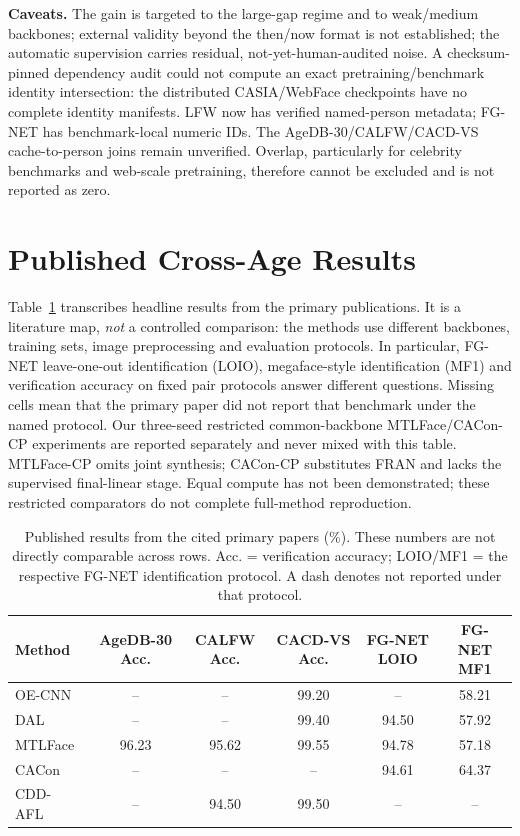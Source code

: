 \documentclass[journal]{IEEEtran}
\begin{document}
\textbf{Caveats.} The gain is targeted to the large-gap regime and to weak/medium backbones; external
validity beyond the then/now format is not established; the automatic supervision carries residual,
not-yet-human-audited noise. A checksum-pinned dependency audit could not compute an exact
pretraining/benchmark identity intersection: the distributed CASIA/WebFace checkpoints have no
complete identity manifests. LFW now has verified named-person metadata; FG-NET has benchmark-local
numeric IDs. The AgeDB-30/CALFW/CACD-VS cache-to-person joins remain unverified. Overlap, particularly for celebrity
benchmarks and web-scale pretraining, therefore cannot be excluded and is not reported as zero.

\section{Published Cross-Age Results}\label{sec:published}
Table~\ref{tab:published} transcribes headline results from the primary publications. It is a literature
map, \emph{not} a controlled comparison: the methods use different backbones, training sets, image
preprocessing and evaluation protocols. In particular, FG-NET leave-one-out identification (LOIO),
megaface-style identification (MF1) and verification accuracy on fixed pair protocols answer different
questions. Missing cells mean that the primary paper did not report that benchmark under the named
protocol. Our three-seed restricted common-backbone MTLFace/CACon-CP experiments are reported
separately and never mixed with this table. MTLFace-CP omits joint synthesis; CACon-CP substitutes
FRAN and lacks the supervised final-linear stage. Equal compute has not been demonstrated;
these restricted comparators do not complete full-method reproduction.

\begin{table}[!t]
\caption{Published results from the cited primary papers (\%). These numbers are not directly
comparable across rows. Acc. = verification accuracy; LOIO/MF1 = the respective FG-NET identification
protocol. A dash denotes not reported under that protocol.}
\label{tab:published}
\centering
\footnotesize
\begin{tabular}{@{}lccccc@{}}
\toprule
Method & AgeDB-30 Acc. & CALFW Acc. & CACD-VS Acc. & FG-NET LOIO & FG-NET MF1 \\
\midrule
OE-CNN~\cite{wang2018oecnn} & -- & -- & 99.20 & -- & 58.21 \\
DAL~\cite{wang2019dal} & -- & -- & 99.40 & 94.50 & 57.92 \\
MTLFace~\cite{huang2021mtlface} & 96.23 & 95.62 & 99.55 & 94.78 & 57.18 \\
CACon~\cite{wang2024cacon} & -- & -- & -- & 94.61 & 64.37 \\
CDD-AFL~\cite{wu2024cddafl} & -- & 94.50 & 99.50 & -- & -- \\
\bottomrule
\end{tabular}
\end{table}
\end{document}
